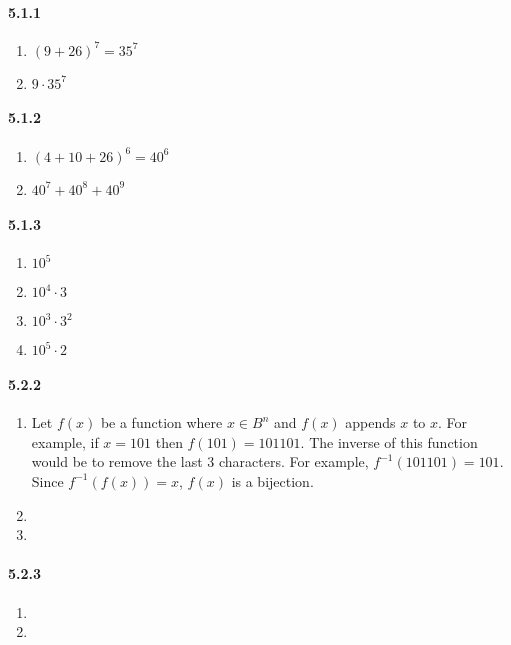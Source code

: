 \documentclass[11pt, letterpaper, twocolumn, fleqn]{article}
\begin{document}
\renewcommand{\labelenumi}{\alph{enumi}.}
\renewcommand{\labelenumii}{(\arabic{enumii})}
\renewcommand{\qedsymbol}{$\blacksquare$}

\paragraph{5.1.1}
\begin{enumerate}
  \item $(9 + 26)^7 = 35^7$
  \item $9 \cdot 35^7$
\end{enumerate}

\paragraph{5.1.2}
\begin{enumerate}
  \item $(4 + 10 + 26)^6 = 40^6$
  \item $40^7 + 40^8 + 40^9$
\end{enumerate}

\paragraph{5.1.3}
\begin{enumerate}
  \item $10^5$
  \item $10^4 \cdot 3$
  \item $10^3 \cdot 3^2$
  \item $10^5 \cdot 2$
\end{enumerate}

\paragraph{5.2.2}
\begin{enumerate}
  \item Let $f(x)$ be a function where $x \in B^n$ and $f(x)$ appends $x$ to $x$. For example, if $x = 101$ then $f(101) = 101101$. The inverse of this function would be to remove the last 3 characters. For example, $f^{-1}(101101) = 101$. Since $f^{-1}(f(x)) = x$, $f(x)$ is a bijection.
  \item
  \item
\end{enumerate}

\paragraph{5.2.3}
\begin{enumerate}
  \item 
  \item
\end{enumerate}
\end{document}
